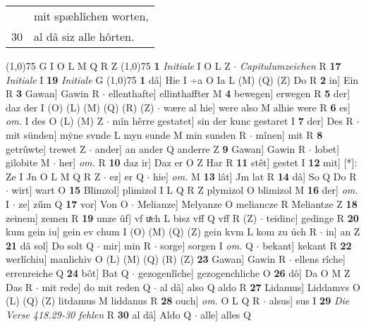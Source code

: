 \documentclass[8pt,a4paper,notitlepage]{article}
\begin{document}
\begin{table}[ht]
\begin{minipage}[t]{0.5\linewidth}
\begin{tabular}{rl}
 & mit spæhlîchen worten,\\ 
30 & al dâ siz alle hôrten.\\ 
\end{tabular}
\scriptsize
\line(1,0){75} \newline
G I O L M Q R Z \newline
\line(1,0){75} \newline
\textbf{1} \textit{Initiale} I O L Z   $\cdot$ \textit{Capitulumzeichen} R  \textbf{17} \textit{Initiale} I  \textbf{19} \textit{Initiale} G  \newline
\line(1,0){75} \newline
\textbf{1} dâ] Hie I ÷a O Ia L (M) (Q) (Z) Do R \textbf{2} in] Ein R \textbf{3} Gawan] Gawin R  $\cdot$ ellenthafte] ellinthaffter M \textbf{4} bewegen] erwegen R \textbf{5} der] daz der I (O) (L) (M) (Q) (R) (Z)  $\cdot$ wære al hie] were also M alhie were R \textbf{6} es] \textit{om.} I des O (L) (M) Z  $\cdot$ mîn hêrre gestatet] sin der kunc gestaret I \textbf{7} der] Des R  $\cdot$ mit sünden] mẏne svnde L myn sunde M min sunden R  $\cdot$ mînen] mit R \textbf{8} getrûwte] trewet Z  $\cdot$ ander] an ander Q anderre Z \textbf{9} Gawan] Gawin R  $\cdot$ lobet] gilobite M  $\cdot$ her] \textit{om.} R \textbf{10} daz ir] Daz er O Z Har R \textbf{11} stêt] gestet I \textbf{12} mit] [*]: Ze I Jn O L M Q R Z  $\cdot$ ez] er Q  $\cdot$ hie] \textit{om.} M \textbf{13} lât] Jm lat R \textbf{14} dâ] So Q Do R  $\cdot$ wirt] wart O \textbf{15} Blimzol] plimizol I L Q R Z plymizol O blimizol M \textbf{16} der] \textit{om.} I  $\cdot$ ze] zűm Q \textbf{17} vor] Von O  $\cdot$ Melianze] Melyanze O meliancze R Meliantze Z \textbf{18} zeinem] zemen R \textbf{19} unze ûf] vf uͯch L bisz vff Q vff R (Z)  $\cdot$ teidinc] gedinge R \textbf{20} kum gein iu] gein ev chum I (O) (M) (Q) (Z) gein kvm L kom zu úch R  $\cdot$ in] an Z \textbf{21} dâ sol] Do solt Q  $\cdot$ mir] min R  $\cdot$ sorge] sorgen I \textit{om.} Q  $\cdot$ bekant] kekant R \textbf{22} werlîchiu] manlichiv O (L) (M) (Q) (R) (Z) \textbf{23} Gawan] Gawin R  $\cdot$ ellens rîche] errenreiche Q \textbf{24} bôt] Bat Q  $\cdot$ gezogenlîche] gezogenchliche O \textbf{26} dô] Da O M Z Das R  $\cdot$ mit rede] do mit reden Q  $\cdot$ al dâ] also Q aldo R \textbf{27} Lidamus] Liddamvs O (L) (Q) (Z) litdamus M liddanus R \textbf{28} ouch] \textit{om.} O L Q R  $\cdot$ alsus] sus I \textbf{29} \textit{Die Verse 418.29-30 fehlen} R  \textbf{30} al dâ] Aldo Q  $\cdot$ alle] alles Q \newline
\end{minipage}

\end{table}
\end{document}
